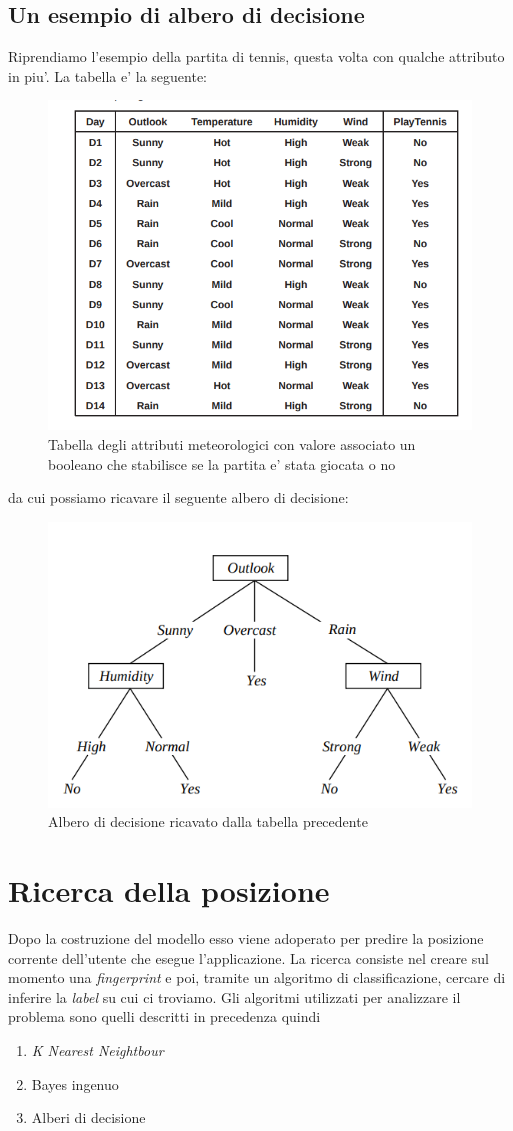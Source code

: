 \subsection*{Un esempio di albero di decisione}
Riprendiamo l'esempio della partita di tennis, questa volta con qualche attributo in piu'. La tabella e' la seguente:
\begin{figure}[H]
	\centering
	\includegraphics[width=0.7\linewidth]{img/decision-_tree_table_tennis}
	\caption{Tabella degli attributi meteorologici con valore associato un booleano che stabilisce se la partita e' stata giocata o no}
	\label{fig:decision-treetabletennis}
\end{figure}
da cui possiamo ricavare il seguente albero di decisione:
\begin{figure}[H]
	\centering
	\includegraphics[width=0.7\linewidth]{img/decision_tree_tree_tennis}
	\caption{Albero di decisione ricavato dalla tabella precedente}
	\label{fig:decisiontreetreetennis}
\end{figure}

\section*{Ricerca della posizione}
Dopo la costruzione del modello esso viene adoperato per predire la posizione corrente dell'utente che esegue l'applicazione. La ricerca consiste nel creare sul momento una \textit{fingerprint} e poi, tramite un algoritmo di classificazione, cercare di inferire la \textit{label}  su cui ci troviamo. Gli algoritmi utilizzati per analizzare il problema sono quelli descritti in precedenza quindi
\begin{enumerate}
	\item \textit{K Nearest Neightbour}
	\item Bayes ingenuo
	\item  Alberi di decisione
\end{enumerate}
\newpage
